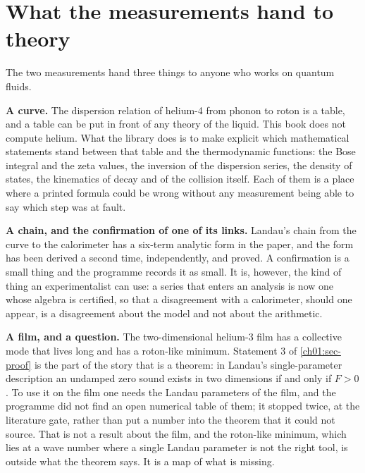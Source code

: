 \section{What the measurements hand to theory}\label{ch01:sec-handover}

The two measurements hand three things to anyone who works on quantum fluids.

\textbf{A curve.} The dispersion relation of helium-4 from phonon to roton is a table, and a table can be put in front of any theory of the liquid. This book does not compute helium. What the library does is to make explicit which mathematical statements stand between that table and the thermodynamic functions: the Bose integral and the zeta values, the inversion of the dispersion series, the density of states, the kinematics of decay and of the collision itself. Each of them is a place where a printed formula could be wrong without any measurement being able to say which step was at fault.

\textbf{A chain, and the confirmation of one of its links.} Landau's chain from the curve to the calorimeter has a six-term analytic form in the paper, and the form has been derived a second time, independently, and proved. A confirmation is a small thing and the programme records it as small. It is, however, the kind of thing an experimentalist can use: a series that enters an analysis is now one whose algebra is certified, so that a disagreement with a calorimeter, should one appear, is a disagreement about the model and not about the arithmetic.

\textbf{A film, and a question.} The two-dimensional helium-3 film has a collective mode that lives long and has a roton-like minimum. Statement 3 of \cref{ch01:sec-proof} is the part of the story that is a theorem: in Landau's single-parameter description an undamped zero sound exists in two dimensions if and only if $F>0$. To use it on the film one needs the Landau parameters of the film, and the programme did not find an open numerical table of them; it stopped twice, at the literature gate, rather than put a number into the theorem that it could not source. That is not a result about the film, and the roton-like minimum, which lies at a wave number where a single Landau parameter is not the right tool, is outside what the theorem says. It is a map of what is missing.

